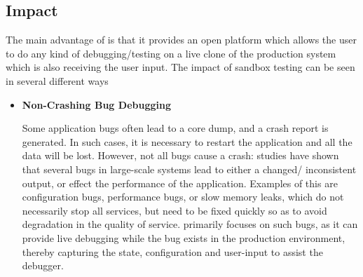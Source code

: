 \subsection{Impact}
\label{sec:impact}

The main advantage of \parikshan is that it provides an open platform which allows the user to do any kind of debugging/testing on a live clone of the production system which is also receiving the user input.
The impact of sandbox testing can be seen in several different ways

\begin{itemize}

 \item \textbf{Non-Crashing Bug Debugging}
 
 Some application bugs often lead to a core dump, and a crash report is generated. 
 In such cases, it is necessary to restart the application and all the data will be lost.
 However,  not all bugs cause a crash: studies have shown \cite{Zhang:2013:ADS:2486788.2486830, liu2005mining, kremenek2007factor} that several bugs in large-scale systems lead to either a changed/ inconsistent output, or effect the performance of the application.
 Examples of this are configuration bugs, performance bugs, or slow memory leaks, which do not necessarily stop all services, but need to be fixed quickly so as to avoid degradation in the quality of service.
 \parikshan primarily focuses on such bugs, as it can provide live debugging while the bug exists in the production environment, thereby capturing the state, configuration and user-input to assist the debugger.


\end{itemize}
